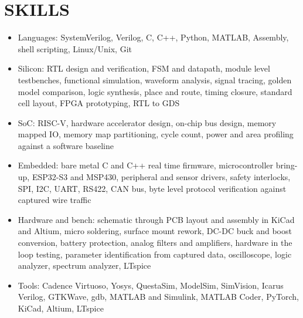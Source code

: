 \documentclass[11pt]{article}
\begin{document}
\section{SKILLS}

\begin{itemize}
    \item Languages: SystemVerilog, Verilog, C, C++, Python, MATLAB, Assembly, shell scripting, Linux/Unix, Git
    \item Silicon: RTL design and verification, FSM and datapath, module level testbenches, functional simulation, waveform analysis, signal tracing, golden model comparison, logic synthesis, place and route, timing closure, standard cell layout, FPGA prototyping, RTL to GDS
    \item SoC: RISC-V, hardware accelerator design, on-chip bus design, memory mapped IO, memory map partitioning, cycle count, power and area profiling against a software baseline
    \item Embedded: bare metal C and C++ real time firmware, microcontroller bring-up, ESP32-S3 and MSP430, peripheral and sensor drivers, safety interlocks, SPI, I2C, UART, RS422, CAN bus, byte level protocol verification against captured wire traffic
    \item Hardware and bench: schematic through PCB layout and assembly in KiCad and Altium, micro soldering, surface mount rework, DC-DC buck and boost conversion, battery protection, analog filters and amplifiers, hardware in the loop testing, parameter identification from captured data, oscilloscope, logic analyzer, spectrum analyzer, LTspice
    \item Tools: Cadence Virtuoso, Yosys, QuestaSim, ModelSim, SimVision, Icarus Verilog, GTKWave, gdb, MATLAB and Simulink, MATLAB Coder, PyTorch, KiCad, Altium, LTspice
\end{itemize}
\end{document}
